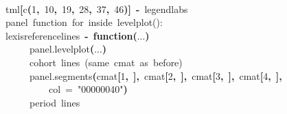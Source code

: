 \documentclass[a4paper]{article}
\newcommand{\hlnumber}[1]{\textcolor[rgb]{0.0823529411764706,0.0784313725490196,0.709803921568627}{#1}}%
\newcommand{\hlfunctioncall}[1]{\textcolor[rgb]{1,0,0}{#1}}%
\newcommand{\hlstring}[1]{\textcolor[rgb]{0.6,0.6,1}{#1}}%
\newcommand{\hlkeyword}[1]{\textcolor[rgb]{0,0,0}{\textbf{#1}}}%
\newcommand{\hlargument}[1]{\textcolor[rgb]{0.694117647058824,0.247058823529412,0.0196078431372549}{#1}}%
\newcommand{\hlcomment}[1]{\textcolor[rgb]{0.8,0.8,0.8}{#1}}%
\newcommand{\hlformalargs}[1]{\textcolor[rgb]{0.0705882352941176,0.713725490196078,0.0705882352941176}{#1}}%
\newcommand{\hlassignement}[1]{\textcolor[rgb]{0.215686274509804,0.215686274509804,0.384313725490196}{\textbf{#1}}}%
\newcommand{\hlsymbol}[1]{\textcolor[rgb]{0,0,0}{#1}}%
\newcommand{\hlprompt}[1]{\textcolor[rgb]{0,0,0}{#1}}%
\newcommand{\hlstd}[1]{\textcolor[rgb]{0,0,0}{#1}}%
\newenvironment{Houtput}{\raggedright}{%
%
}
\begin{document}
\begin{Houtput}
\normalfont
\hspace*{\fill}\\
\hlstd{}\ttfamily\noindent
\hlprompt{\usebox{\hlnormalsizeboxgreaterthan}{\ }}\hlsymbol{tml}\hlkeyword{[}\hlfunctioncall{c}\hlkeyword{(}\hlnumber{1}\hlkeyword{,}{\ }\hlnumber{10}\hlkeyword{,}{\ }\hlnumber{19}\hlkeyword{,}{\ }\hlnumber{28}\hlkeyword{,}{\ }\hlnumber{37}\hlkeyword{,}{\ }\hlnumber{46}\hlkeyword{)}\hlkeyword{]}{\ }\hlassignement{\usebox{\hlnormalsizeboxlessthan}-}{\ }\hlsymbol{legendlabs}\mbox{}
\normalfont
\hspace*{\fill}\\
\hlstd{}\ttfamily\noindent
\hlprompt{\usebox{\hlnormalsizeboxgreaterthan}{\ }}\hlcomment{\usebox{\hlnormalsizeboxhash}{\ }panel{\ }function{\ }for{\ }inside{\ }levelplot():}\mbox{}
\normalfont
\hspace*{\fill}\\
\hlstd{}\ttfamily\noindent
\hlprompt{\usebox{\hlnormalsizeboxgreaterthan}{\ }}\hlsymbol{lexisreferencelines}{\ }\hlassignement{\usebox{\hlnormalsizeboxlessthan}-}{\ }\hlkeyword{function}\hlkeyword{(}\hlformalargs{...}\hlkeyword{)}{\ }\hlkeyword{\usebox{\hlnormalsizeboxopenbrace}}\hspace*{\fill}\\
\hlstd{}\hlprompt{{\ }}{\ }{\ }{\ }{\ }\hlfunctioncall{panel.levelplot}\hlkeyword{(}\hlsymbol{...}\hlkeyword{)}\hspace*{\fill}\\
\hlstd{}\hlprompt{{\ }}{\ }{\ }{\ }{\ }\hlcomment{\usebox{\hlnormalsizeboxhash}{\ }cohort{\ }lines{\ }(same{\ }cmat{\ }as{\ }before)}\hspace*{\fill}\\
\hlstd{}\hlprompt{{\ }}{\ }{\ }{\ }{\ }\hlfunctioncall{panel.segments}\hlkeyword{(}\hlsymbol{cmat}\hlkeyword{[}\hlnumber{1}\hlkeyword{,}{\ }\hlkeyword{]}\hlkeyword{,}{\ }\hlsymbol{cmat}\hlkeyword{[}\hlnumber{2}\hlkeyword{,}{\ }\hlkeyword{]}\hlkeyword{,}{\ }\hlsymbol{cmat}\hlkeyword{[}\hlnumber{3}\hlkeyword{,}{\ }\hlkeyword{]}\hlkeyword{,}{\ }\hlsymbol{cmat}\hlkeyword{[}\hlnumber{4}\hlkeyword{,}{\ }\hlkeyword{]}\hlkeyword{,}\hspace*{\fill}\\
\hlstd{}\hlprompt{{\ }}{\ }{\ }{\ }{\ }{\ }{\ }{\ }{\ }\hlargument{col}{\ }\hlargument{=}{\ }\hlstring{"\usebox{\hlnormalsizeboxhash}00000040"}\hlkeyword{)}\hspace*{\fill}\\
\hlstd{}\hlprompt{{\ }}{\ }{\ }{\ }{\ }\hlcomment{\usebox{\hlnormalsizeboxhash}{\ }period{\ }lines}\hspace*{\fill}\\

\end{Houtput}
\end{document}
